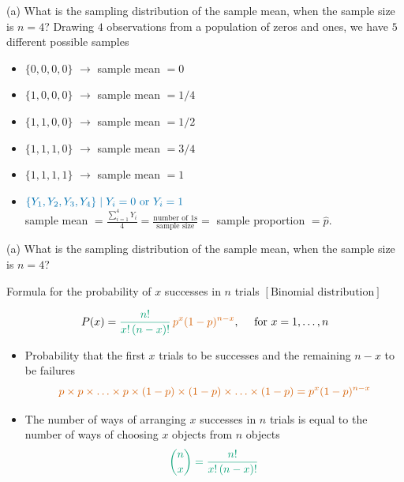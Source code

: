 \documentclass[
  11pt,
  ignorenonframetext,
]{beamer}
\providecommand{\tightlist}{%
  \setlength{\itemsep}{0pt}\setlength{\parskip}{0pt}}
\begin{document}
\begin{frame}{(a) What is the sampling distribution of the sample mean,
when the sample size is \(n = 4\)?}
\protect\hypertarget{a-what-is-the-sampling-distribution-of-the-sample-mean-when-the-sample-size-is-n-4}{}
Drawing \(4\) observations from a population of zeros and ones, we have
\(5\) different possible samples

\begin{itemize}
\tightlist
\item
  \(\{0,0,0,0\}\) \(\rightarrow\) sample mean \(=0\)
\item
  \(\{1,0,0,0\}\) \(\rightarrow\) sample mean \(=1/4\)
\item
  \(\{1,1,0,0\}\) \(\rightarrow\) sample mean \(=1/2\)
\item
  \(\{1,1,1,0\}\) \(\rightarrow\) sample mean \(=3/4\)
\item
  \(\{1,1,1,1\}\) \(\rightarrow\) sample mean \(=1\)
\end{itemize}

\vspace{3mm}

\pause

\begin{itemize}
\tightlist
\item
  \(\color{blue}{\{Y_1,Y_2,Y_3,Y_4\} \mid Y_i = 0 \text{ or } Y_i = 1}\)\\
  sample mean
  \(= \frac{\sum_{i=1}^4Y_i}{4} = \frac{\text{number of 1s}}{\text{sample size}} =\)
  sample proportion \(=\hat{p}\).
\end{itemize}
\end{frame}

\begin{frame}{(a) What is the sampling distribution of the sample mean,
when the sample size is \(n = 4\)?}
\protect\hypertarget{a-what-is-the-sampling-distribution-of-the-sample-mean-when-the-sample-size-is-n-4-1}{}
\small

Formula for the probability of \(x\) successes in \(n\) trials
\href{https://en.wikipedia.org/wiki/Binomial_distribution}{\(\left[\text{Binomial distribution}\right]\)}

\[
P(x) ={\color{green}{\frac{n!}{x!\,(n-x)!}}}\,{\color{red}{p^x(1-p)^{n-x}}}, \quad \text{ for } {x = 1,\ldots,n}
\]

\begin{itemize}
\item
  Probability that the first \(x\) trials to be successes and the
  remaining \(n-x\) to be failures \[
  \color{red}{p\times p \times \ldots \times p \times (1-p)\times (1-p)\times \ldots \times (1-p) = p^x(1-p)^{n-x}}
  \]
\item
  The number of ways of arranging \(x\) successes in \(n\) trials is
  equal to the number of ways of choosing \(x\) objects from \(n\)
  objects \[
  \color{green}{{n \choose x} = \frac{n!}{x!\,(n-x)!}}
  \]
\end{itemize}
\end{frame}
\end{document}
